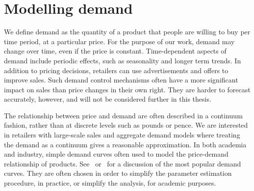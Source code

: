 \documentclass[main.tex]{subfiles}
\begin{document}
\section{Modelling demand}\label{sec:intro_model_demand}
We define demand as the quantity of a product that people are willing
to buy per time period, at a particular price. For the purpose of our
work, demand may change over time, even if the price is constant.
Time-dependent aspects of demand include periodic effects, such as
seasonality and longer term trends.
In addition to pricing decisions, retailers can use advertisements and
offers to improve sales. Such demand control mechanisms often have a
more significant impact on sales than price changes in their own
right. They are harder to forecast accurately, however, and will not
be considered further in this thesis.

The relationship between price and demand are often described in a
continuum fashion, rather than at discrete levels such as pounds or
pence. We are interested in retailers with large-scale sales and
aggregate demand models where treating the demand as a continuum gives
a reasonable approximation.
In both academia and industry, simple demand curves often used to
model the price-demand relationship of
products. See~\cite[Ch.~7.3]{talluri2006theory} or~\cite{phillips2005pricing}
for a discussion of the most popular demand curves. They are often
chosen in order to simplify the parameter
estimation procedure, in practice, or simplify the analysis, for academic purposes.
\end{document}
